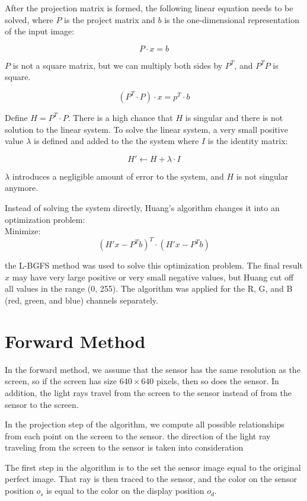 After the projection matrix is formed, the following linear equation needs to be solved, where $P$ is the project matrix and $b$ is the one-dimensional representation of the input image:

$$P \cdot x = b$$

$P$ is not a square matrix, but we can multiply both sides by $P^{T}$, and $P^TP$ is square.

$$(P^T \cdot P) \cdot x = p^T \cdot b$$

Define $H = P^T \cdot P$. There is a high chance that $H$ is singular and there is not solution to the linear system. To solve the linear system, a very small positive value $\lambda$ is defined and added to the the system where $I$ is the identity matrix:

$$H' \leftarrow H + \lambda \cdot I$$

$\lambda$ introduces a negligible amount of error to the system, and $H$ is not singular anymore.

Instead of solving the system directly, Huang's algorithm changes it into an optimization problem: \\

Minimize: $$(H'x - P^Tb)^T \cdot (H'x-P^Tb)$$

the L-BGFS method was used to solve this optimization problem. The final result $x$ may have very large positive or very small negative values, but Huang cut off all values in the range (0, 255). The algorithm was applied for the R, G, and B (red, green, and blue) channels separately.


\section{Forward Method}

In the forward method, we assume that the sensor has the same resolution as the screen, so if the screen has size $640 \times 640$ pixels, then so does the sensor. In addition, the light rays travel from the screen to the sensor instead of from the sensor to the screen.

In the projection step of the algorithm, we compute all possible relationships from each point on the screen to the sensor. the direction of the light ray traveling from the screen to the sensor is taken into consideration

The first step in the algorithm is to the set the sensor image equal to the original perfect image. That ray is then traced to the sensor, and the color on the sensor position $o_s$ is equal to the color on the display position $o_d$. 

